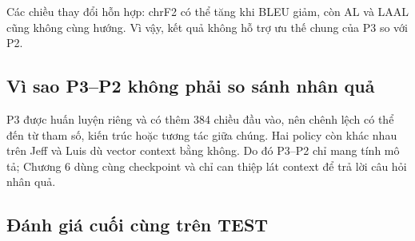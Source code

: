 \documentclass[11pt,a4paper]{article}
\numberwithin{figure}{section}
\numberwithin{table}{section}
\begin{document}
Các chiều thay đổi hỗn hợp: chrF2 có thể tăng khi BLEU giảm, còn AL và LAAL cũng không cùng hướng. Vì vậy, kết quả không hỗ trợ ưu thế chung của P3 so với P2.

\subsection{Vì sao P3--P2 không phải so sánh nhân quả}
P3 được huấn luyện riêng và có thêm 384 chiều đầu vào, nên chênh lệch có thể đến từ tham số, kiến trúc hoặc tương tác giữa chúng. Hai policy còn khác nhau trên Jeff và Luis dù vector context bằng không. Do đó P3--P2 chỉ mang tính mô tả; Chương 6 dùng cùng checkpoint và chỉ can thiệp lát context để trả lời câu hỏi nhân quả.

\subsection{Đánh giá cuối cùng trên TEST}

\begin{table}[!htbp]
  \centering
  \caption{Kết quả đánh giá cuối cùng trên TEST sau khi thiết kế đã cố định.}
  \label{tab:final-test}
  \scriptsize
  \setlength{\tabcolsep}{3.5pt}
\end{table}
\end{document}
